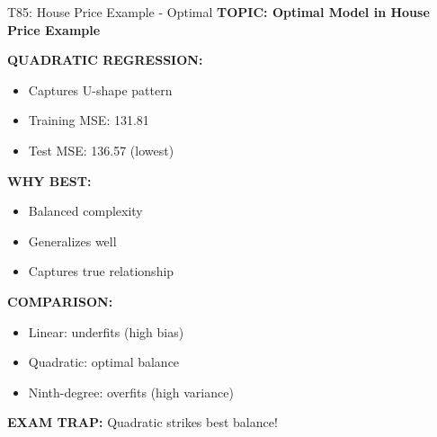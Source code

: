 \documentclass[8pt]{beamer}
\begin{document}
	\begin{frame}{T85: House Price Example - Optimal}
		\fontsize{6.5}{7.5}\selectfont
		\textbf{TOPIC: Optimal Model in House Price Example}
		
		\vspace{0.1cm}
		\textbf{QUADRATIC REGRESSION:}
		\begin{itemize}
			\item Captures U-shape pattern
			\item Training MSE: 131.81
			\item Test MSE: 136.57 (lowest)
		\end{itemize}
		
		\vspace{0.1cm}
		\textbf{WHY BEST:}
		\begin{itemize}
			\item Balanced complexity
			\item Generalizes well
			\item Captures true relationship
		\end{itemize}
		
		\vspace{0.1cm}
		\textbf{COMPARISON:}
		\begin{itemize}
			\item Linear: underfits (high bias)
			\item Quadratic: optimal balance
			\item Ninth-degree: overfits (high variance)
		\end{itemize}
		
		\textcolor{myred}{\textbf{EXAM TRAP:}} Quadratic strikes \textcolor{myblue}{best balance}!
	\end{frame}
	
	
\end{document}
